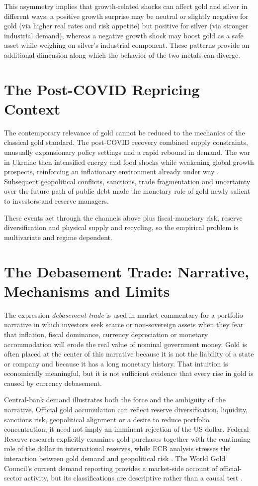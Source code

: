 This asymmetry implies that growth-related shocks can affect gold and silver in different
ways: a positive growth surprise may be neutral or slightly negative for gold (via higher
real rates and risk appetite) but positive for silver (via stronger industrial demand),
whereas a negative growth shock may boost gold as a safe asset while weighing on silver’s
industrial component. These patterns provide an additional dimension along which the
behavior of the two metals can diverge.
\section{The Post-COVID Repricing Context}

The contemporary relevance of gold cannot be reduced to the mechanics of the
classical gold standard. The post-COVID recovery combined supply constraints,
unusually expansionary policy settings and a rapid rebound in demand. The war
in Ukraine then intensified energy and food shocks while weakening global
growth prospects, reinforcing an inflationary environment already under way
\cite{imf-war-inflation-2022}. Subsequent geopolitical conflicts, sanctions,
trade fragmentation and uncertainty over the future path of public debt made
the monetary role of gold newly salient to investors and reserve managers.

These events act through the channels above plus fiscal-monetary risk,
reserve diversification and physical supply and recycling, so the empirical
problem is multivariate and regime dependent.

\section{The Debasement Trade: Narrative, Mechanisms and Limits}

The expression \emph{debasement trade} is used in market commentary for a
portfolio narrative in which investors seek scarce or non-sovereign assets
when they fear that inflation, fiscal dominance, currency depreciation or
monetary accommodation will erode the real value of nominal government money.
Gold is often placed at the center of this narrative because it is not the
liability of a state or company and because it has a long monetary history.
That intuition is economically meaningful, but it is not sufficient evidence
that every rise in gold is caused by currency debasement.

Central-bank demand illustrates both the force and the ambiguity of the
narrative. Official gold accumulation can reflect reserve diversification,
liquidity, sanctions risk, geopolitical alignment or a desire to reduce
portfolio concentration; it need not imply an imminent rejection of the US
dollar. Federal Reserve research explicitly examines gold purchases together
with the continuing role of the dollar in international reserves, while ECB
analysis stresses the interaction between gold demand and geopolitical risk
\cite{fed-gold-reserves-2025,ecb-gold-risk-2025}. The World Gold Council's
current demand reporting provides a market-side account of official-sector
activity, but its classifications are descriptive rather than a causal test
\cite{wgc-gdt-q2-2026}.

